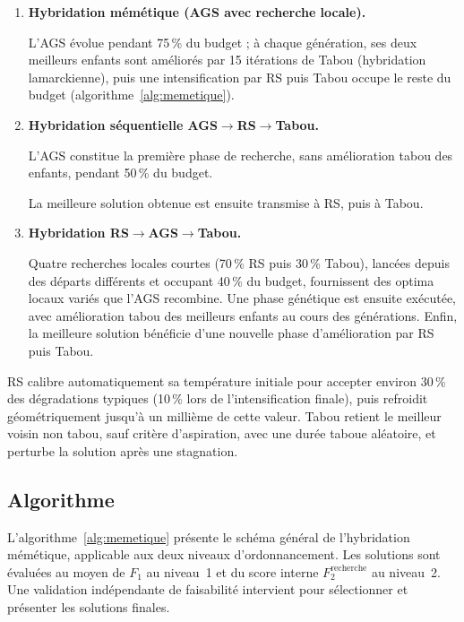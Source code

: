 \documentclass[11pt,a4paper]{article}
\begin{document}
\begin{enumerate}

    \item \textbf{Hybridation mémétique (AGS avec recherche locale).}

    L'AGS évolue pendant 75\,\% du budget ; à chaque génération, ses deux meilleurs enfants sont améliorés par 15 itérations de Tabou (hybridation lamarckienne), puis une intensification par RS puis Tabou occupe le reste du budget (algorithme~\ref{alg:memetique}).

    \item \textbf{Hybridation séquentielle AGS$\rightarrow$RS$\rightarrow$Tabou.}

    L'AGS constitue la première phase de recherche, sans amélioration tabou des enfants, pendant 50\,\% du budget.

    La meilleure solution obtenue est ensuite transmise à RS, puis à Tabou.

    \item \textbf{Hybridation RS$\rightarrow$AGS$\rightarrow$Tabou.}

    Quatre recherches locales courtes (70\,\% RS puis 30\,\% Tabou), lancées depuis des départs différents et occupant 40\,\% du budget, fournissent des optima locaux variés que l'AGS recombine. Une phase génétique est ensuite exécutée, avec amélioration tabou des meilleurs enfants au cours des générations. Enfin, la meilleure solution bénéficie d'une nouvelle phase d'amélioration par RS puis Tabou.

\end{enumerate}

RS calibre automatiquement sa température initiale pour accepter environ 30\,\% des dégradations typiques (10\,\% lors de l'intensification finale), puis refroidit géométriquement jusqu'à un millième de cette valeur. Tabou retient le meilleur voisin non tabou, sauf critère d'aspiration, avec une durée taboue aléatoire, et perturbe la solution après une stagnation.


\subsection{Algorithme}

L'algorithme~\ref{alg:memetique} présente le schéma général de l'hybridation mémétique, applicable aux deux niveaux d'ordonnancement. Les solutions sont évaluées au moyen de $F_1$ au niveau~1 et du score interne $F_2^{\mathrm{recherche}}$ au niveau~2. Une validation indépendante de faisabilité intervient pour sélectionner et présenter les solutions finales.
\end{document}

